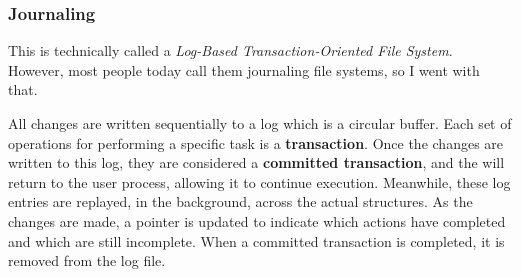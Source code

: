 \subsubsection{Journaling}\label{subsubsec:Journaling}
This is technically called a \emph{Log-Based Transaction-Oriented File System}.
However, most people today call them journaling file systems, so I went with that.

All  changes are written sequentially to a log which is a circular buffer.
Each set of operations for performing a specific task is a \textbf{transaction}.
Once the changes are written to this log, they are considered a \textbf{committed transaction}, and the  will return to the user process, allowing it to continue execution.
Meanwhile, these log entries are replayed, in the background, across the actual  structures.
As the changes are made, a pointer is updated to indicate which actions have completed and which are still incomplete.
When a committed transaction is completed, it is removed from the log file.


